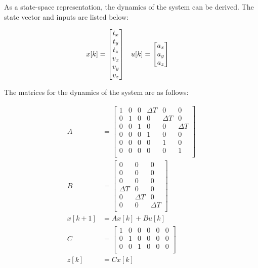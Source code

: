 \documentclass[bare_jrnl_transmag]{subfiles}
\begin{document}
As a state-space representation, the dynamics of the system can be derived. The state vector and inputs are listed below:

\begin{align*}
    x[k] &= {\null\hbox{$\begin{bmatrix}
    t_x \\
    t_y \\
    t_z \\
    v_x \\
    v_y \\
    v_z
    \end{bmatrix}$}}
    \quad
    u[k] = {\null\hbox{$\begin{bmatrix}
    a_x \\
    a_y \\
    a_z
    \end{bmatrix}$}}
\end{align*}

The matrices for the dynamics of the system are as follows:

\begin{align*}
    A &= 
    \begin{bmatrix}
    1 & 0 & 0 & \Delta T & 0 & 0 \\
    0 & 1 & 0 & 0 & \Delta T & 0 \\
    0 & 0 & 1 & 0 & 0 & \Delta T \\
    0 & 0 & 0 & 1 & 0 & 0 \\
    0 & 0 & 0 & 0 & 1 & 0 \\
    0 & 0 & 0 & 0 & 0 & 1 \\
    \end{bmatrix}
    \\[1em]
    B &= 
    \begin{bmatrix}
    0 & 0 & 0 \\
    0 & 0 & 0 \\
    0 & 0 & 0 \\
    \Delta T & 0 & 0 \\
    0 & \Delta T & 0 \\
    0 & 0 & \Delta T \\
    \end{bmatrix}
    \\[1em]
    x[k+1] &= A x[k] + B u[k]
    \\[1em]
    C &= 
    \begin{bmatrix}
    1 & 0 & 0 & 0 & 0 & 0 \\
    0 & 1 & 0 & 0 & 0 & 0 \\
    0 & 0 & 1 & 0 & 0 & 0 \\
    \end{bmatrix}
    \\[1em]
    z[k] &= C x[k]
\end{align*}
\end{document}
